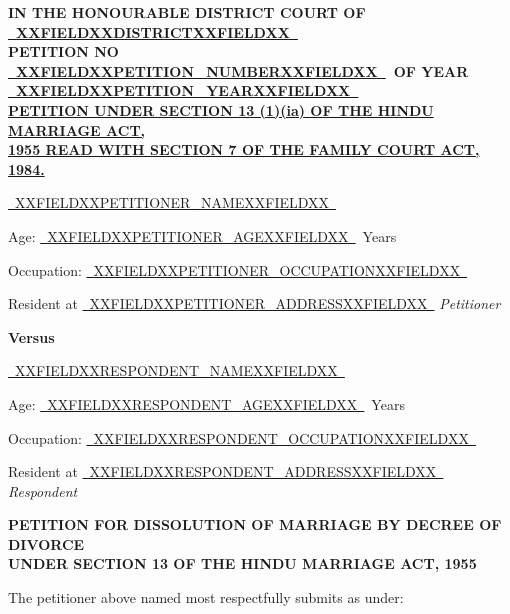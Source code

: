 \documentclass[12pt,a4paper]{article}
\newcommand{\fillline}[1]{\underline{~#1~}}
\begin{document}
\begin{center}
  {\large\bfseries IN THE HONOURABLE DISTRICT COURT OF \fillline{XXFIELDXXDISTRICTXXFIELDXX}}\\[8pt]
  {\large\bfseries PETITION NO \fillline{XXFIELDXXPETITION_NUMBERXXFIELDXX}\ OF YEAR \fillline{XXFIELDXXPETITION_YEARXXFIELDXX}}\\[18pt]
  {\normalsize\bfseries\uline{%
    PETITION UNDER SECTION 13 (1)(ia) OF THE HINDU MARRIAGE ACT,\\[4pt]
    1955 READ WITH SECTION 7 OF THE FAMILY COURT ACT, 1984.%
  }}
\end{center}

\vspace{16pt}

\fillline{XXFIELDXXPETITIONER_NAMEXXFIELDXX}

Age: \fillline{XXFIELDXXPETITIONER_AGEXXFIELDXX}\ Years

Occupation: \fillline{XXFIELDXXPETITIONER_OCCUPATIONXXFIELDXX}

Resident at \fillline{XXFIELDXXPETITIONER_ADDRESSXXFIELDXX}
\hfill\textit{Petitioner}

\vspace{10pt}
\textbf{Versus}
\vspace{10pt}

\fillline{XXFIELDXXRESPONDENT_NAMEXXFIELDXX}

Age: \fillline{XXFIELDXXRESPONDENT_AGEXXFIELDXX}\ Years

Occupation: \fillline{XXFIELDXXRESPONDENT_OCCUPATIONXXFIELDXX}

Resident at \fillline{XXFIELDXXRESPONDENT_ADDRESSXXFIELDXX}
\hfill\textit{Respondent}

\vspace{16pt}

\begin{center}
  \textbf{PETITION FOR DISSOLUTION OF MARRIAGE BY DECREE OF DIVORCE\\
  UNDER SECTION 13 OF THE HINDU MARRIAGE ACT, 1955}
\end{center}

The petitioner above named most respectfully submits as under:

\vspace{8pt}
\end{document}
